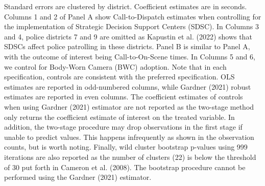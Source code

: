 \begin{table}[H]
\begin{threeparttable}
\begin{tablenotes}
\item Standard errors are clustered by district.                      Coefficient estimates are in seconds.                      Columns 1 and 2 of Panel A show                       Call-to-Dispatch estimates when controlling for the implementation                      of Strategic                      Decision Support Centers (SDSC). In Columns 3 and 4,                       police districts 7 and 9 are omitted as Kapustin et al. (2022) shows that SDSCs                       affect                      police patrolling in these districts. Panel B is similar to Panel A,                      with the outcome of interest being Call-to-On-Scene times. In Columns 5 and 6,                      we control for Body-Worn Camera (BWC) adoption. Note that in each specification,                      controls are consistent with the preferred specification. OLS estimates are reported                      in odd-numbered columns, while Gardner (2021) robust estimates are reported in even columns.                      The coefficient estimates of controls when using Gardner (2021) estimator are not reported as the                       two-stage method only returns the coefficient estimate of interest on                      the treated variable. In addition, the two-stage procedure may drop observations                      in the first stage if unable to predict values. This happens infrequently as shown                      in the observation counts, but is worth noting. Finally,                      wild cluster bootstrap p-values using 999 iterations are also reported                  as the number of clusters (22) is below the threshold of 30 put forth in                  Cameron et al. (2008). The bootstrap procedure cannot be performed using the Gardner (2021) estimator.                                                           
\end{tablenotes}
\end{threeparttable}
\end{table}
